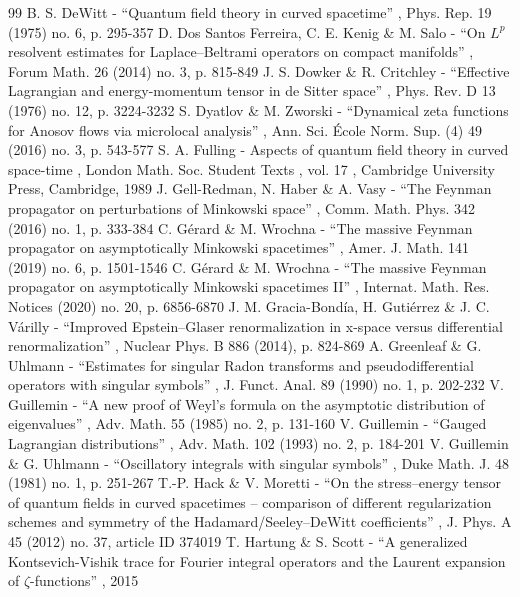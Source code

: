 \begin{thebibliography}{99}
 B. S. DeWitt - “Quantum field theory in curved spacetime” , Phys. Rep. 19 (1975) no. 6, p. 295-357
 D. Dos Santos Ferreira, C. E. Kenig \& M. Salo - “On $L^p$ resolvent estimates for Laplace–Beltrami operators on compact manifolds” , Forum Math. 26 (2014) no. 3, p. 815-849
 J. S. Dowker \& R. Critchley - “Effective Lagrangian and energy-momentum tensor in de Sitter space” , Phys. Rev. D 13 (1976) no. 12, p. 3224-3232
 S. Dyatlov \& M. Zworski - “Dynamical zeta functions for Anosov flows via microlocal analysis” , Ann. Sci. École Norm. Sup. (4) 49 (2016) no. 3, p. 543-577
 S. A. Fulling - Aspects of quantum field theory in curved space-time , London Math. Soc. Student Texts , vol. 17 , Cambridge University Press, Cambridge, 1989
 J. Gell-Redman, N. Haber \& A. Vasy - “The Feynman propagator on perturbations of Minkowski space” , Comm. Math. Phys. 342 (2016) no. 1, p. 333-384
 C. Gérard \& M. Wrochna - “The massive Feynman propagator on asymptotically Minkowski spacetimes” , Amer. J. Math. 141 (2019) no. 6, p. 1501-1546
 C. Gérard \& M. Wrochna - “The massive Feynman propagator on asymptotically Minkowski spacetimes II” , Internat. Math. Res. Notices (2020) no. 20, p. 6856-6870
 J. M. Gracia-Bondía, H. Gutiérrez \& J. C. Várilly - “Improved Epstein–Glaser renormalization in x-space versus differential renormalization” , Nuclear Phys. B 886 (2014), p. 824-869
 A. Greenleaf \& G. Uhlmann - “Estimates for singular Radon transforms and pseudodifferential operators with singular symbols” , J. Funct. Anal. 89 (1990) no. 1, p. 202-232
 V. Guillemin - “A new proof of Weyl’s formula on the asymptotic distribution of eigenvalues” , Adv. Math. 55 (1985) no. 2, p. 131-160
 V. Guillemin - “Gauged Lagrangian distributions” , Adv. Math. 102 (1993) no. 2, p. 184-201
 V. Guillemin \& G. Uhlmann - “Oscillatory integrals with singular symbols” , Duke Math. J. 48 (1981) no. 1, p. 251-267
 T.-P. Hack \& V. Moretti - “On the stress–energy tensor of quantum fields in curved spacetimes – comparison of different regularization schemes and symmetry of the Hadamard/Seeley–DeWitt coefficients” , J. Phys. A 45 (2012) no. 37, article ID 374019
 T. Hartung \& S. Scott - “A generalized Kontsevich-Vishik trace for Fourier integral operators and the Laurent expansion of $\zeta $-functions” , 2015

\end{thebibliography}

